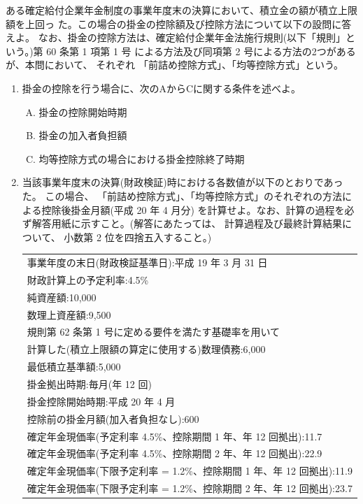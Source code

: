 \begin{shortanswer}[数理人試験 H19 問題4]
  ある確定給付企業年金制度の事業年度末の決算において、積立金の額が積立上限額を上回っ
  た。この場合の掛金の控除額及び控除方法について以下の設問に答えよ。
  なお、掛金の控除方法は、確定給付企業年金法施行規則(以下「規則」という。)第 60 条第 1 項第 1 号
  による方法及び同項第 2 号による方法の2つがあるが、本問において、
  それぞれ 「前詰め控除方式」、「均等控除方式」という。
  \begin{enumerate}[(1)]
    \item 掛金の控除を行う場合に、次のAからCに関する条件を述べよ。 
    \begin{enumerate}[A. ]
      \item 掛金の控除開始時期
      \item 掛金の加入者負担額
      \item 均等控除方式の場合における掛金控除終了時期
    \end{enumerate}
    \item 当該事業年度末の決算(財政検証)時における各数値が以下のとおりであった。
    この場合、 「前詰め控除方式」、「均等控除方式」のそれぞれの方法による控除後掛金月額(平成 20 年 4 月分)
    を計算せよ。なお、計算の過程を必ず解答用紙に示すこと。(解答にあたっては、 計算過程及び最終計算結果について、
    小数第 2 位を四捨五入すること。)

    \begin{table}[htbp]
      \centering
      \begin{tabular}{|l|}\hline
        事業年度の末日(財政検証基準日):平成 19 年 3 月 31 日 \\
        財政計算上の予定利率:4.5\% \\
        純資産額:10,000 \\
        数理上資産額:9,500 \\
        規則第 62 条第 1 号に定める要件を満たす基礎率を用いて\\
          \;\;\;\; 計算した(積立上限額の算定に使用する)数理債務:6,000\\
        最低積立基準額:5,000\\
        掛金拠出時期:毎月(年 12 回)\\
        掛金控除開始時期:平成 20 年 4 月\\
        控除前の掛金月額(加入者負担なし):600\\
        確定年金現価率(予定利率 4.5\%、控除期間 1 年、年 12 回拠出):11.7\\
        確定年金現価率(予定利率 4.5\%、控除期間 2 年、年 12 回拠出):22.9\\
        確定年金現価率(下限予定利率 = 1.2\%、控除期間 1 年、年 12 回拠出):11.9 \\
        確定年金現価率(下限予定利率 = 1.2\%、控除期間 2 年、年 12 回拠出):23.7 \\ \hline
      \end{tabular}
    \end{table}
  \end{enumerate}
\end{shortanswer}

